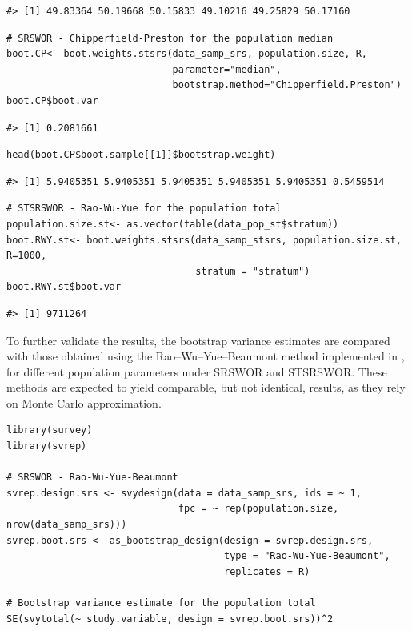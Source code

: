 \begin{verbatim}
#> [1] 49.83364 50.19668 50.15833 49.10216 49.25829 50.17160
\end{verbatim}

\begin{verbatim}
# SRSWOR - Chipperfield-Preston for the population median
boot.CP<- boot.weights.stsrs(data_samp_srs, population.size, R,
                             parameter="median",
                             bootstrap.method="Chipperfield.Preston")
boot.CP$boot.var
\end{verbatim}

\begin{verbatim}
#> [1] 0.2081661
\end{verbatim}

\begin{verbatim}
head(boot.CP$boot.sample[[1]]$bootstrap.weight)
\end{verbatim}

\begin{verbatim}
#> [1] 5.9405351 5.9405351 5.9405351 5.9405351 5.9405351 0.5459514
\end{verbatim}

\begin{verbatim}
# STSRSWOR - Rao-Wu-Yue for the population total
population.size.st<- as.vector(table(data_pop_st$stratum))
boot.RWY.st<- boot.weights.stsrs(data_samp_stsrs, population.size.st, R=1000,
                                 stratum = "stratum")
boot.RWY.st$boot.var
\end{verbatim}

\begin{verbatim}
#> [1] 9711264
\end{verbatim}

To further validate the results, the bootstrap variance estimates are compared with those obtained using the Rao--Wu--Yue--Beaumont method implemented in , for different population parameters under SRSWOR and STSRSWOR. These methods are expected to yield comparable, but not identical, results, as they rely on Monte Carlo approximation.

\begin{verbatim}
library(survey)
library(svrep)

# SRSWOR - Rao-Wu-Yue-Beaumont
svrep.design.srs <- svydesign(data = data_samp_srs, ids = ~ 1,
                              fpc = ~ rep(population.size, nrow(data_samp_srs)))
svrep.boot.srs <- as_bootstrap_design(design = svrep.design.srs,
                                      type = "Rao-Wu-Yue-Beaumont",
                                      replicates = R)

# Bootstrap variance estimate for the population total
SE(svytotal(~ study.variable, design = svrep.boot.srs))^2
\end{verbatim}

